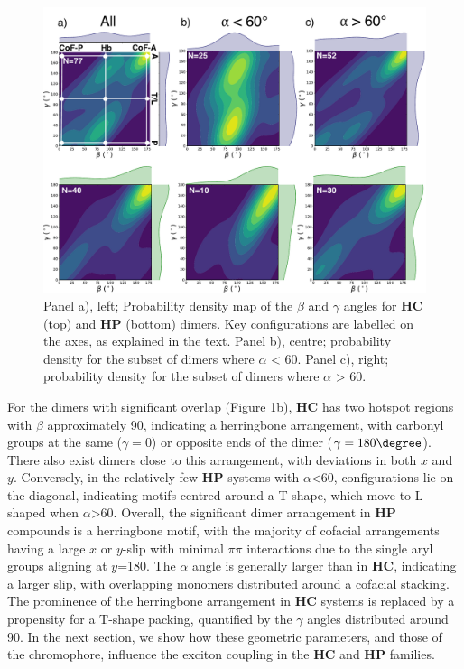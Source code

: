 \begin{figure}
\centering
  \includegraphics[width=0.8\linewidth]{dimer_classification}
  \caption[Probability density maps of $\beta$ and $\gamma$ angles.]{Panel a), left; Probability density map of the $\beta$ and $\gamma$ angles for \textbf{HC} (top) and \textbf{HP} (bottom) dimers. Key configurations are labelled on the axes, as explained in the text. Panel b), centre; probability density for the subset of dimers where $\alpha$ \textless{}  60\degree{}.  Panel c), right; probability density for the subset of dimers where $\alpha$ \textgreater{} 60\degree{}.}
  \label{figure: dimer_classification}
\end{figure}

For the dimers with significant overlap (Figure \ref{figure: dimer_classification}b), \textbf{HC} has two hotspot regions with $\beta$ approximately 90\degree, indicating a herringbone arrangement, with carbonyl groups at the same ($\gamma=$0\degree) or opposite ends of the dimer ($\gamma=180\degree$). There also exist dimers close to this arrangement, with deviations in both $x$ and $y$. Conversely, in the relatively few \textbf{HP} systems with  $\alpha$\textless{60}, configurations lie on the diagonal, indicating motifs centred around a T-shape, which move to L-shaped when $\alpha$\textgreater{60}. Overall, the significant dimer arrangement in \textbf{HP} compounds is a herringbone motif, with the majority of cofacial arrangements having a large $x$ or $y$-slip with minimal $\pi\pi$ interactions due to the single aryl groups aligning at $y$=180\degree. The $\alpha$ angle is generally larger than in \textbf{HC}, indicating a larger slip, with overlapping monomers distributed around a cofacial stacking. The prominence of the herringbone arrangement in \textbf{HC} systems is replaced by a propensity for a T-shape packing, quantified by the $\gamma$ angles distributed around 90\degree. In the next section, we show how these geometric parameters, and those of the chromophore, influence the exciton coupling in the \textbf{HC} and \textbf{HP} families.
